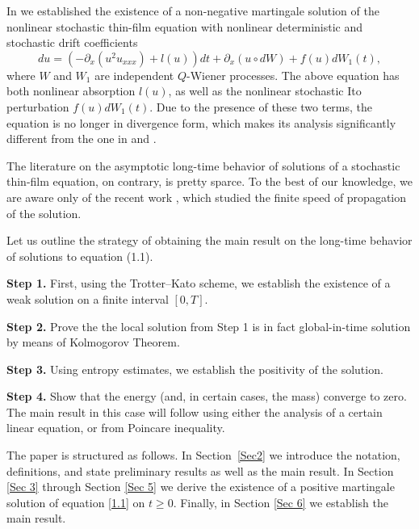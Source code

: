 \documentclass[a4paper,12pt]{article}
\numberwithin{equation}{section}
\begin{document}
In \cite{KapMisSta23} we established the existence of a non-negative martingale solution of the nonlinear stochastic thin-film  equation with nonlinear deterministic and stochastic drift coefficients
\begin{equation*}
du = (-\partial_x(u^{2}u_{xxx})  + l(u))dt + \partial_x (u \circ dW)+ f(u)dW_1(t),
\end{equation*}
where $W$ and $W_1$ are independent $Q$-Wiener processes. 
The above equation has both nonlinear absorption $l(u)$, as well as the nonlinear stochastic Ito perturbation $f(u) d W_1(t)$. Due to the presence of these two terms, the equation is no longer in divergence form, which makes its analysis significantly different from the one in \cite{Gess1} and \cite{Gess2}. 

The literature on the asymptotic long-time behavior of solutions of a stochastic thin-film equation, on contrary, is pretty sparce. To the best of our knowledge, we are aware only of the recent work \cite{GRLO}, which studied the finite speed of propagation of the solution.

Let us outline the strategy of obtaining the main result on the long-time behavior of solutions to equation (1.1).

\medskip

\noindent
\textbf{Step 1.}
First, using the Trotter--Kato scheme, we establish the existence of a weak solution on a finite interval $[0,T]$.

\medskip

\noindent
\textbf{Step 2.}
Prove the the local solution from Step 1 is in fact global-in-time solution by means of Kolmogorov Theorem.

\medskip

\noindent
\textbf{Step 3.}
Using entropy estimates, we establish the positivity of the solution.

\medskip

\noindent
\textbf{Step 4.} Show that the energy (and, in certain cases, the mass) converge to zero. The main result in this case will follow using either the analysis of a certain linear equation, or from Poincare inequality. 


\medskip

The paper is structured as follows. In Section~\ref{Sec2} we introduce the notation, definitions, and state preliminary results as well as the main result. In Section \ref{Sec 3} through Section \ref{Sec 5} we derive the existence of a positive martingale solution of equation \eqref{1.1} on $t \geq 0$. Finally, in Section \ref{Sec 6} we establish the main result. 
\end{document}
